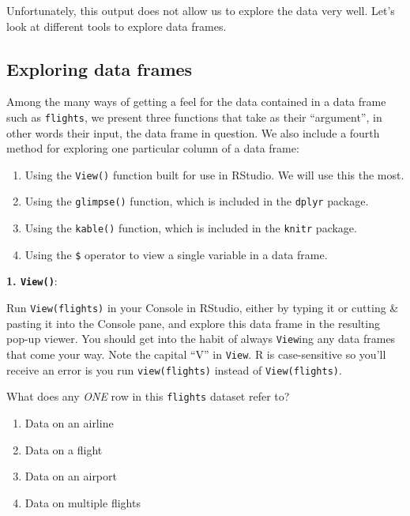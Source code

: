 \documentclass[
  letterpaper,
  DIV=11,
  numbers=noendperiod]{scrreprt}
\providecommand{\tightlist}{%
  \setlength{\itemsep}{0pt}\setlength{\parskip}{0pt}}\usepackage{longtable,booktabs,array}
\theoremstyle{definition}
\theoremstyle{remark}
\begin{document}
Unfortunately, this output does not allow us to explore the data very
well. Let's look at different tools to explore data frames.

\hypertarget{sec-exploredataframes}{%
\subsection{Exploring data frames}\label{sec-exploredataframes}}

Among the many ways of getting a feel for the data contained in a data
frame such as \texttt{flights}, we present three functions that take as
their ``argument'', in other words their input, the data frame in
question. We also include a fourth method for exploring one particular
column of a data frame:

\begin{enumerate}
\def\labelenumi{\arabic{enumi}.}
\tightlist
\item
  Using the \texttt{View()} function built for use in RStudio. We will
  use this the most.
\item
  Using the \texttt{glimpse()} function, which is included in the
  \texttt{dplyr} package.
\item
  Using the \texttt{kable()} function, which is included in the
  \texttt{knitr} package.
\item
  Using the \texttt{\$} operator to view a single variable in a data
  frame.
\end{enumerate}

\textbf{1. \texttt{View()}}:

Run \texttt{View(flights)} in your Console in RStudio, either by typing
it or cutting \& pasting it into the Console pane, and explore this data
frame in the resulting pop-up viewer. You should get into the habit of
always \texttt{View}ing any data frames that come your way. Note the
capital ``V'' in \texttt{View}. R is case-sensitive so you'll receive an
error is you run \texttt{view(flights)} instead of
\texttt{View(flights)}.

\begin{tcolorbox}[enhanced jigsaw, colback=white, toprule=.15mm, bottomrule=.15mm, titlerule=0mm, title={{🎯} Learning Check 1.3}, leftrule=.75mm, arc=.35mm, left=2mm, colframe=quarto-callout-tip-color-frame, coltitle=black, opacitybacktitle=0.6, bottomtitle=1mm, colbacktitle=quarto-callout-tip-color!10!white, opacityback=0, toptitle=1mm, rightrule=.15mm, breakable]

What does any \emph{ONE} row in this \texttt{flights} dataset refer to?

\begin{enumerate}
\def\labelenumi{\alph{enumi}.}
\tightlist
\item
  Data on an airline
\item
  Data on a flight
\item
  Data on an airport
\item
  Data on multiple flights
\end{enumerate}

\end{tcolorbox}
\end{document}
